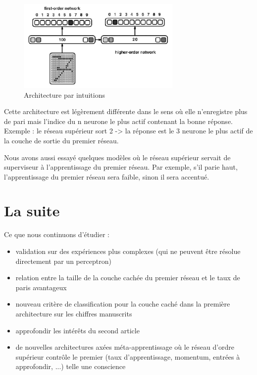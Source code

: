 \documentclass[a4paper,12pt, twoside]{article}
\begin{document}
\begin{figure}[H]
 \begin{center}
 \includegraphics[width=300px]{../pre-presentation/nth_wta.png}
\end{center}
\caption{Architecture par intuitions}
\end{figure}

Cette architecture est légèrement différente dans le sens où elle n'enregistre
plus de pari mais l'indice du n neurone le plus actif contenant la bonne réponse.
Exemple : le réseau supérieur sort 2 -> la réponse est le 3 neurone le plus actif 
de la couche de sortie du premier réseau.
\newline

Nous avons aussi essayé quelques modèles où le réseau supérieur servait de superviseur
à l'apprentissage du premier réseau. Par exemple, s'il parie haut, l'apprentissage du premier réseau
sera faible, sinon il sera accentué.

\section{La suite}

Ce que nous continuons d'étudier : 
\begin{itemize}
 \item validation sur des expériences plus complexes (qui ne peuvent être résolue directement par un perceptron)
 \item relation entre la taille de la couche cachée du premier réseau et le taux de paris avantageux
 \item nouveau critère de classification pour la couche caché dans la première architecture sur les chiffres manuscrits
 \item approfondir les intérêts du second article \cite{Pasquali_2010}
 \item de nouvelles architectures axées méta-apprentissage où le réseau d'ordre supérieur contrôle le premier
 (taux d'apprentissage, momentum, entrées à approfondir, ...) telle une conscience
\end{itemize}
\end{document}

